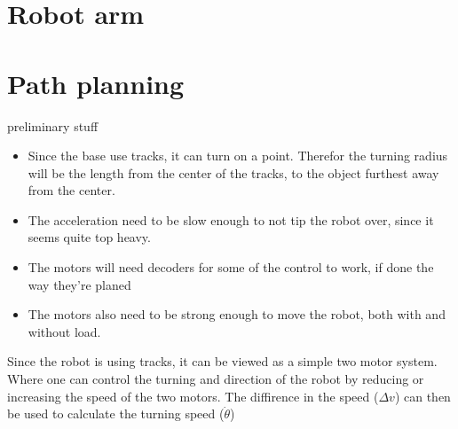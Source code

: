 \section*{Robot arm}
\section*{Path planning}
preliminary stuff
\begin{itemize}
    \item Since the base use tracks, it can turn on a point. Therefor the turning radius will be the length from the center of the tracks, to the object furthest away from the center.
    \item The acceleration need to be slow enough to not tip the robot over, since it seems quite top heavy.
    \item The motors will need decoders for some of the control to work, if done the way they're planed
    \item The motors also need to be strong enough to move the robot, both with and without load.
\end{itemize}

Since the robot is using tracks, it can be viewed as a simple two motor system. Where one can control the turning
 and direction of the robot by reducing or increasing the speed of the two motors. The diffirence in the speed ($\Delta v$)
 can then be used to calculate the turning speed ($\dot{\theta}$)